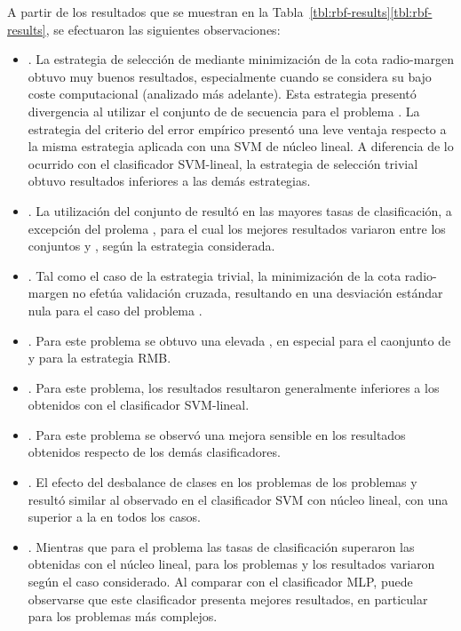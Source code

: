 %

A partir de los resultados que se muestran en la
\iflatexml{}Tabla~\ref{tbl:rbf-results}\else\autoref{tbl:rbf-results}\fi{},
se efectuaron las siguientes observaciones:
%
%
\begin{itemize}
\item
  .
  La estrategia de selección de  mediante minimización de la
  cota radio-margen obtuvo muy buenos resultados, especialmente cuando
  se considera su bajo coste computacional (analizado más adelante).
  Esta estrategia presentó divergencia al utilizar el conjunto de
   de secuencia  para el problema \prob\mipred{}.
  La estrategia del criterio del error empírico presentó una leve
  ventaja respecto a la misma estrategia aplicada con una SVM de
  núcleo lineal.
  A diferencia de lo ocurrido con el clasificador SVM-lineal, la
  estrategia de selección trivial obtuvo resultados inferiores a las
  demás estrategias.
\item
  .
  La utilización del conjunto de   resultó en las
  mayores tasas de clasificación, a excepción del prolema
  \prob\mipred{}, para el cual los mejores resultados variaron entre
  los conjuntos  y , según la estrategia considerada.
\item
  .
  Tal como el caso de la estrategia trivial, la minimización de la
  cota radio-margen no efetúa validación cruzada, resultando en una
  desviación estándar nula para el caso del problema
  \prob\tripletsvm{}.
\item
  .
  Para este problema se obtuvo una elevada \SE{}, en especial para el
  caonjunto de   y para la estrategia RMB.
\item
  .
  Para este problema, los resultados resultaron generalmente
  inferiores a los obtenidos con el clasificador SVM-lineal.
\item
  .
  Para este problema se observó una mejora sensible en los resultados
  obtenidos respecto de los demás clasificadores.
\item
  .
  El efecto del desbalance de clases en los problemas de los problemas
  \prob\mipred{} y \prob\micropred{} resultó similar al observado en
  el clasificador SVM con núcleo lineal, con una \SP{} superior a la
  \SE{} en todos los casos.
\item
  .
  Mientras que para el problema \prob\tripletsvm{} las tasas de
  clasificación superaron las obtenidas con el núcleo lineal, para los
  problemas \prob\mipred{} y \prob\micropred{} los resultados variaron
  según el caso considerado.
  Al comparar con el clasificador MLP, puede observarse que este
  clasificador presenta mejores resultados, en particular para los
  problemas más complejos.
\end{itemize}
%
